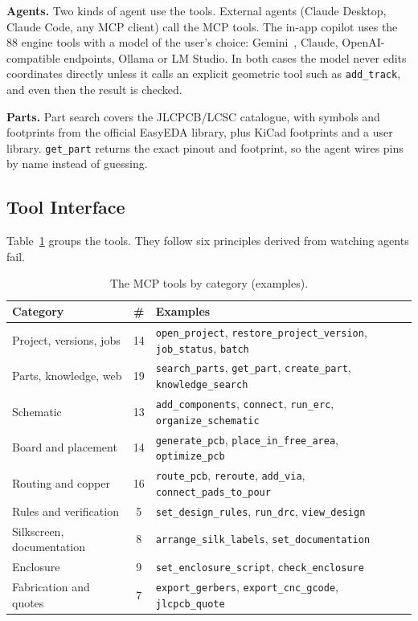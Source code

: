 \documentclass[journal]{IEEEtran}
\newcommand{\tool}[1]{\texttt{\small #1}}
\begin{document}
\textbf{Agents.} Two kinds of agent use the tools. External agents (Claude Desktop, Claude Code, any MCP client) call the \ToolCount{} MCP tools. The in-app copilot uses the 88 engine tools with a model of the user's choice: Gemini~\cite{gemini2023}, Claude, OpenAI-compatible endpoints, Ollama or LM Studio. In both cases the model never edits coordinates directly unless it calls an explicit geometric tool such as \tool{add\_track}, and even then the result is checked.

\textbf{Parts.} Part search covers the JLCPCB/LCSC catalogue, with symbols and footprints from the official EasyEDA library, plus KiCad footprints and a user library. \tool{get\_part} returns the exact pinout and footprint, so the agent wires pins by name instead of guessing.

\subsection{Tool Interface}
\label{sec:tools}

Table~\ref{tab:tools} groups the tools. They follow six principles derived from watching agents fail.

\begin{table}[t]
\centering
\caption{The \ToolCount{} MCP tools by category (examples).}
\label{tab:tools}
\footnotesize
\setlength{\tabcolsep}{3pt}
\begin{tabular}{@{}lc>{\raggedright\arraybackslash}p{47mm}@{}}
\toprule
Category & \# & Examples \\
\midrule
Project, versions, jobs & 14 & \tool{open\_project}, \tool{restore\_project\_version}, \tool{job\_status}, \tool{batch} \\
Parts, knowledge, web & 19 & \tool{search\_parts}, \tool{get\_part}, \tool{create\_part}, \tool{knowledge\_search} \\
Schematic & 13 & \tool{add\_components}, \tool{connect}, \tool{run\_erc}, \tool{organize\_schematic} \\
Board and placement & 14 & \tool{generate\_pcb}, \tool{place\_in\_free\_area}, \tool{optimize\_pcb} \\
Routing and copper & 16 & \tool{route\_pcb}, \tool{reroute}, \tool{add\_via}, \tool{connect\_pads\_to\_pour} \\
Rules and verification & 5 & \tool{set\_design\_rules}, \tool{run\_drc}, \tool{view\_design} \\
Silkscreen, documentation & 8 & \tool{arrange\_silk\_labels}, \tool{set\_documentation} \\
Enclosure & 9 & \tool{set\_enclosure\_script}, \tool{check\_enclosure} \\
Fabrication and quotes & 7 & \tool{export\_gerbers}, \tool{export\_cnc\_gcode}, \tool{jlcpcb\_quote} \\
\bottomrule
\end{tabular}
\vspace{-2mm}
\end{table}
\end{document}
